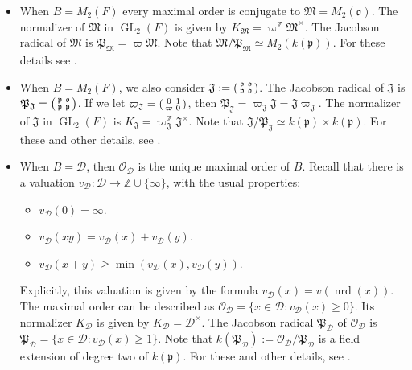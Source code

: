 \documentclass{article}
\theoremstyle{named}
\newcommand{\D}{\mathcal{D}}
\newcommand{\Z}{\mathbb{Z}}
\newcommand{\M}{\mathfrak{M}}
\newcommand{\J}{\mathfrak{J}}
\renewcommand{\O}{\mathcal{O}}
\renewcommand{\o}{\mathfrak{o}}
\renewcommand{\P}{\mathfrak{P}}
\newcommand{\p}{\mathfrak{p}}
\DeclareMathOperator{\GL}{GL}
\DeclareMathOperator{\nrd}{nrd}
\begin{document}
\begin{itemize}
    \item When $B = M_2(F)$ every maximal order is conjugate to $\M = M_2(\o)$. The normalizer of $\M$ in $\GL_2(F)$ is given by $K_\M = \varpi^\Z \M^\times$. The Jacobson radical of $\M$ is $\P_\M = \varpi \M$. Note that $\M/\P_\M \simeq M_2(k(\p))$. For these details see \cite[Paragraph 23.2.3]{voight}.
    
    \item When $B = M_2(F)$, we also consider $\J := \begin{psmallmatrix}
    \o & \o\\
    \p & \o
\end{psmallmatrix}$. The Jacobson radical of $\J$ is $\P_\J = \begin{psmallmatrix}
    \p & \o\\
    \p & \p
\end{psmallmatrix}$. If we let $\varpi_\J = \begin{psmallmatrix}
    0 & 1\\
    \varpi & 0
\end{psmallmatrix}$, then $\P_\J = \varpi_\J \J = \J \varpi_\J$. The normalizer of $\J$ in $\GL_2(F)$ is $K_\J = \varpi_\J^\Z \J^\times$. Note that $\J/\P_\J \simeq k(\p)\times k(\p)$. For these and other details, see \cite[Section 23.3]{voight}.

\item When $B = \D$, then $\O_\D$ is the unique maximal order of $B$. Recall that there is a valuation $v_\D: \D\rightarrow \Z \cup \{\infty\}$, with the usual properties:
\begin{itemize}
    \item $v_\D(0) = \infty$.
    \item $v_\D(xy) = v_\D(x) + v_\D(y)$.
    \item $v_\D(x + y) \geq \min(v_\D(x), v_\D(y))$.
\end{itemize} 
Explicitly, this valuation is given by the formula $v_\D(x) = v(\nrd(x))$. The maximal order can be described as $\O_\D = \{x \in \D: v_\D(x) \geq 0\}$. Its normalizer $K_\D$ is given by $K_\D = \D^\times$. The Jacobson radical $\P_\D$ of $\O_\D$ is $\P_\D = \{x \in \D: v_\D(x) \geq 1\}$. Note that $k(\P_\D) := \O_\D / \P_\D$ is a field extension of degree two of $k(\p)$. For these and other details, see \cite[Section 13.3]{voight}.
\end{itemize}
\end{document}
